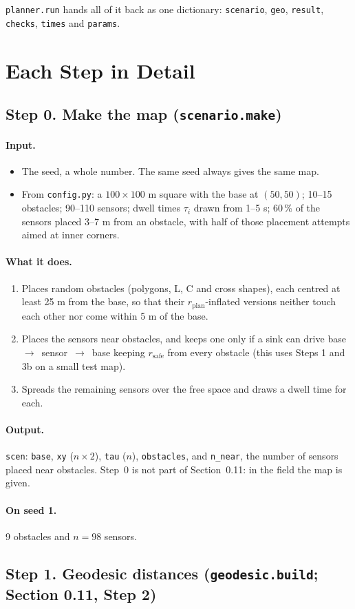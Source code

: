 \documentclass[10pt]{article}
\newcommand{\code}[1]{\texttt{#1}}
\newcommand{\rplan}{r_{\mathrm{plan}}}
\newcommand{\rsafe}{r_{\mathrm{safe}}}
\newcommand{\inputs}{\paragraph{Input.}}
\newcommand{\does}{\paragraph{What it does.}}
\newcommand{\outputs}{\paragraph{Output.}}
\newcommand{\seedone}{\paragraph{On seed 1.}}
\begin{document}
\code{planner.run} hands all of it back as one dictionary: \code{scenario}, \code{geo}, \code{result},
\code{checks}, \code{times} and \code{params}.

\section{Each Step in Detail}

\subsection*{Step 0. Make the map (\code{scenario.make})}

\inputs
\begin{itemize}
  \item The seed, a whole number. The same seed always gives the same map.
  \item From \code{config.py}: a $100\times100$ m square with the base at $(50, 50)$; 10--15 obstacles; 90--110
    sensors; dwell times $\tau_i$ drawn from 1--5 s; 60\,\% of the sensors placed 3--7 m from an obstacle, with half
    of those placement attempts aimed at inner corners.
\end{itemize}
\does
\begin{enumerate}
  \item Places random obstacles (polygons, L, C and cross shapes), each centred at least 25 m from the base, so that
    their $\rplan$-inflated versions neither touch each other nor come within 5 m of the base.
  \item Places the sensors near obstacles, and keeps one only if a sink can drive base~$\to$~sensor~$\to$~base
    keeping $\rsafe$ from every obstacle (this uses Steps 1 and 3b on a small test map).
  \item Spreads the remaining sensors over the free space and draws a dwell time for each.
\end{enumerate}
\outputs
\code{scen}: \code{base}, \code{xy} ($n\times2$), \code{tau} ($n$), \code{obstacles}, and \code{n\_near}, the number of
sensors placed near obstacles. Step~0 is not part of Section~0.11: in the field the map is given.
\seedone 9 obstacles and $n = 98$ sensors.

\subsection*{Step 1. Geodesic distances (\code{geodesic.build}; Section 0.11, Step 2)}
\end{document}
